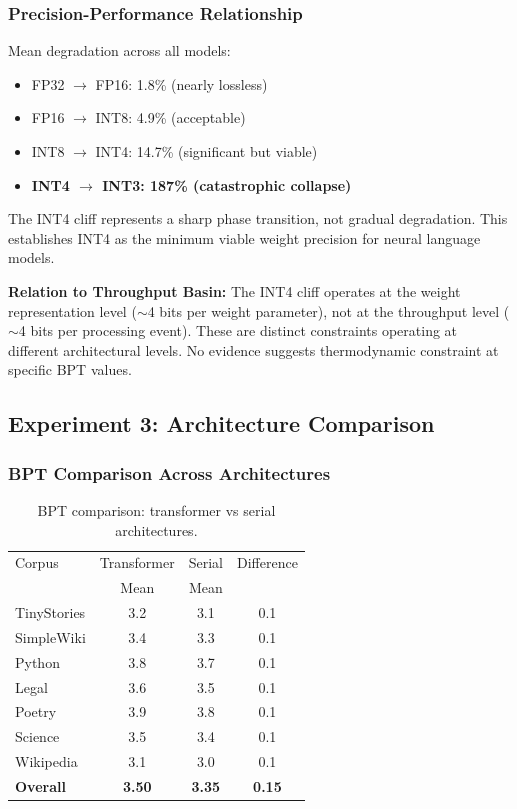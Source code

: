 \documentclass[11pt,a4paper]{article}
\begin{document}
\subsubsection{Precision-Performance Relationship}

Mean degradation across all models:
\begin{itemize}
\item FP32 $\rightarrow$ FP16: 1.8\% (nearly lossless)
\item FP16 $\rightarrow$ INT8: 4.9\% (acceptable)
\item INT8 $\rightarrow$ INT4: 14.7\% (significant but viable)
\item \textbf{INT4 $\rightarrow$ INT3: 187\% (catastrophic collapse)}
\end{itemize}

The INT4 cliff represents a sharp phase transition, not gradual degradation. This establishes INT4 as the minimum viable weight precision for neural language models.

\textbf{Relation to Throughput Basin:} The INT4 cliff operates at the weight representation level ($\sim$4 bits per weight parameter), not at the throughput level ($\sim$4 bits per processing event). These are distinct constraints operating at different architectural levels. No evidence suggests thermodynamic constraint at specific BPT values.

\subsection{Experiment 3: Architecture Comparison}

\subsubsection{BPT Comparison Across Architectures}

\begin{table}[h]
\centering
\begin{tabular}{lccc}
\toprule
Corpus & Transformer & Serial & Difference \\
 & Mean & Mean &  \\
\midrule
TinyStories & 3.2 & 3.1 & 0.1 \\
SimpleWiki & 3.4 & 3.3 & 0.1 \\
Python & 3.8 & 3.7 & 0.1 \\
Legal & 3.6 & 3.5 & 0.1 \\
Poetry & 3.9 & 3.8 & 0.1 \\
Science & 3.5 & 3.4 & 0.1 \\
Wikipedia & 3.1 & 3.0 & 0.1 \\
\midrule
\textbf{Overall} & \textbf{3.50} & \textbf{3.35} & \textbf{0.15} \\
\bottomrule
\end{tabular}
\caption{BPT comparison: transformer vs serial architectures.}
\label{tab:arch-comp}
\end{table}
\end{document}
